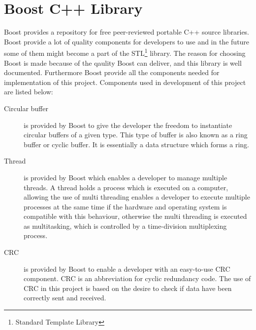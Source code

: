 \chapter{Boost C++ Library}\label{app:boost}
Boost provides a repository for free peer-reviewed portable C++ source libraries. Boost provide a lot of quality components for developers to use and in the future some of them might become a part of the STL\footnote{Standard Template Library} library. The reason for choosing Boost is made because of the qaulity Boost can deliver, and this library is well documented. Furthermore Boost provide all the components needed for implementation of this project. Components used in development of this project are listed below:

\begin{description}
\item[Circular buffer]
is provided by Boost to give the developer the freedom to instantiate circular buffers of a given type. This type of buffer is also known as a ring buffer or cyclic buffer. It is essentially a data structure which forms a ring. 

\item[Thread]
is provided by Boost which enables a developer to manage multiple threads. A thread holds a process which is executed on a computer, allowing the use of multi threading enables a developer to execute multiple processes at the same time if the hardware and operating system is compatible with this behaviour, otherwise the multi threading is executed as multitasking, which is controlled by a time-division multiplexing process.

\item[CRC]
is provided by Boost to enable a developer with an easy-to-use CRC component. CRC is an abbreviation for cyclic redundancy code. The use of CRC in this project is based on the desire to check if data have been correctly sent and received.
\end{description}